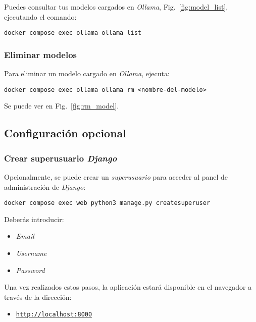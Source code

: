 Puedes consultar tus modelos cargados en \textit{Ollama}, Fig.~\ref{fig:model_list}, ejecutando el comando:

\begin{verbatim}
docker compose exec ollama ollama list
\end{verbatim}


\subsubsection*{Eliminar modelos}

Para eliminar un modelo cargado en \textit{Ollama}, ejecuta:

\begin{verbatim}
docker compose exec ollama ollama rm <nombre-del-modelo>
\end{verbatim}
Se puede ver en Fig.~\ref{fig:rm_model}.


\subsection{Configuración opcional}

\subsubsection{Crear superusuario \emph{Django}}{\label{sec:superuser}}

Opcionalmente, se puede crear un \textit{superusuario} para acceder al panel de administración de \textit{Django}:

\begin{verbatim}
docker compose exec web python3 manage.py createsuperuser
\end{verbatim}

Deberás introducir:
\begin{itemize}
    \item \emph{Email}
    \item \emph{Username}
    \item \emph{Password}
\end{itemize}

Una vez realizados estos pasos, la aplicación estará disponible en el navegador a través de la dirección:

\begin{itemize}
    \item \href{http://localhost:8000}{\texttt{http://localhost:8000}}
\end{itemize}

